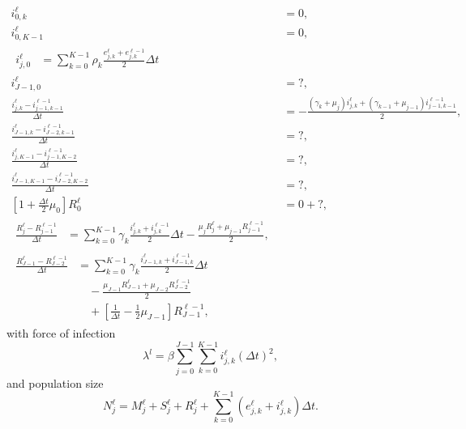 \documentclass{jpmarticle}
\let\subequationsorig\subequations%
\let\endsubequationsorig\endsubequations%
\renewenvironment{subequations}{
  \subequationsorig
  \renewcommand{\theequation}{\theparentequation.\arabic{equation}}
}{
  \endsubequationsorig
}
\begin{document}
\begin{subequations}
\begin{align}
    i_{0, k}^{\ell}
    &= 0,
    \\
    i_{0, K - 1}^{\ell}
    &= 0,
    \\
    \begin{split}
      i_{j, 0}^{\ell}
      &=
      \sum_{k = 0}^{K - 1} \rho_k
      \frac{e_{j, k}^{\ell} + e_{j, k}^{\ell - 1}} {2}
      \Delta t
    \end{split}
    \\
    i_{J - 1, 0}^{\ell}
    &= ?,
    \\
    \frac{i_{j, k}^{\ell} - i_{j - 1, k - 1}^{\ell - 1}}{\Delta t}
    &=
    - \frac{(\gamma_k + \mu_j) i_{j, k}^{\ell}
      + (\gamma_{k - 1} + \mu_{j - 1}) i_{j - 1, k - 1}^{\ell - 1}}
    {2},
    \\
    \frac{i_{J - 1, k}^{\ell} - i_{J - 2, k - 1}^{\ell - 1}}{\Delta t}
    &= ?,
    \\
    \frac{i_{j, K - 1}^{\ell} - i_{j - 1, K - 2}^{\ell - 1}}{\Delta t}
    &= ?,
    \\
    \frac{i_{J - 1, K - 1}^{\ell} - i_{J - 2, K - 2}^{\ell - 1}}{\Delta t}
    &= ?,
    \\
    \left[1 + \frac{\Delta t}{2} \mu_0\right] R_0^{\ell}
    &= 0 + ?,
    \\
    \begin{split}
      \frac{R_j^{\ell} - R_{j - 1}^{\ell - 1}}{\Delta t}
      &= \sum_{k = 0}^{K - 1} \gamma_k
      \frac{i_{j, k}^{\ell} + i_{j, k}^{\ell - 1}}
      {2}
      \Delta t
      - \frac{\mu_j R_j^{\ell}
        + \mu_{j - 1} R_{j - 1}^{\ell - 1}}
      {2},
    \end{split}
    \\
    \begin{split}
      \frac{R_{J - 1}^{\ell} - R_{J - 2}^{\ell - 1}}{\Delta t}
      &= \sum_{k = 0}^{K - 1} \gamma_k
      \frac{i_{J - 1, k}^{\ell} + i_{J - 1, k}^{\ell - 1}}
      {2}
      \Delta t
      \\ & \quad {}
      - \frac{\mu_{J - 1} R_{J - 1}^{\ell}
        + \mu_{J - 2} R_{J - 2}^{\ell - 1}}
      {2}
      \\ & \quad {}
      + \left[
        \frac{1}{\Delta t}
        - \frac{1}{2} \mu_{J - 1}
      \right] R_{J - 1}^{\ell - 1},
    \end{split}
  \end{align}
  with force of infection
  \begin{equation}
    \lambda^l =
    \beta \sum_{j = 0}^{J - 1} \sum_{k = 0}^{K - 1} i_{j, k}^{\ell}
    (\Delta t)^2,
  \end{equation}
  and population size
  \begin{equation}
    N_j^{\ell} =
    M_j^{\ell} + S_j^{\ell} + R_j^{\ell}
    + \sum_{k = 0}^{K - 1}
    \left(e_{j, k}^{\ell} + i_{j, k}^{\ell}\right)
    \Delta t.
  \end{equation}
\end{subequations}
\end{document}
